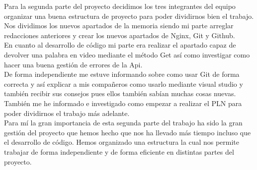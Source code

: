 Para la segunda parte del proyecto decidimos los tres integrantes del equipo organizar una buena estructura de proyecto para poder dividirnos bien el trabajo.
Nos dividimos los nuevos apartados de la memoria siendo mi parte arreglar redacciones anteriores y crear los nuevos apartados de Nginx, Git y Github.\\

En cuanto al desarrollo de código mi parte era realizar el apartado capaz de devolver una palabra en video mediante el método Get así como investigar como hacer  una buena gestión de errores de la Api.\\

De forma independiente me estuve informando sobre como usar Git de forma correcta y así explicar a mis compañeros como usarlo mediante visual studio y también recibir sus consejos pues ellos también sabían muchas cosas nuevas. También me he informado e investigado como empezar a realizar el PLN para poder dividirnos el trabajo más adelante.\\

Para mí la gran importancia de esta segunda parte del trabajo ha sido la gran gestión del proyecto que hemos hecho que nos ha llevado más tiempo incluso que el desarrollo de código. Hemos organizado una estructura la cual nos permite trabajar de forma independiente y de forma eficiente en distintas partes del proyecto.











